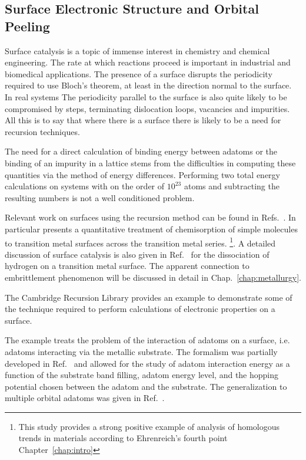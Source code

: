 \subsection{Surface Electronic Structure and Orbital Peeling}
Surface catalysis is a topic of immense interest in chemistry and chemical engineering.
The rate at which reactions proceed is important in industrial and biomedical 
applications. The presence of a surface disrupts the periodicity required to use Bloch's theorem,
at least in the direction normal to the surface. In real systems
The periodicity parallel to the surface is also quite likely to 
be compromised by steps, terminating dislocation loops, 
vacancies and impurities. All this is to say that where 
there is a surface there is likely to be a need for recursion
techniques.

The need for a direct calculation of binding energy between adatoms or
the binding of an impurity in a lattice stems from the difficulties in computing 
these quantities via the method of energy differences. Performing two total
energy calculations on systems with on the order of $10^23$ atoms and subtracting the
resulting numbers is not a well conditioned problem. 

Relevant work on surfaces using the recursion method can be found in 
Refs.~\cite{haydock72, kelly73, kelly74, kelly74b, burke76, haydock79, haydock82}.
In particular \cite{haydock79} presents a quantitative treatment of chemisorption of simple
molecules to transition metal surfaces across the transition metal series. 
\footnote{This study provides a strong positive example of analysis of homologous 
trends in materials according to Ehrenreich's fourth point Chapter~\ref{chap:intro}}.
A detailed discussion of surface catalysis is also given in Ref.~\cite{haydock80}
for the dissociation of hydrogen on a transition metal surface. The apparent
connection to embrittlement phenomenon will be discussed in detail in Chap.~\ref{chap:metallurgy}.

The Cambridge Recursion Library provides an example 
to demonstrate some of the technique required to perform 
calculations of electronic properties on a surface. 

The example treats the problem of the interaction of adatoms on a 
surface, i.e. adatoms interacting via the metallic substrate.
The formalism was partially developed in Ref.~\cite{einstein73} and 
allowed for the study of adatom interaction energy 
as a function of the substrate band filling, adatom energy level, and the hopping
potential chosen between the adatom and the substrate. The generalization
to multiple orbital adatoms was given in Ref.~\cite{burke76}. 

